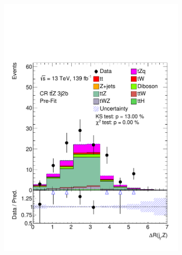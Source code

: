 \begin{figure}
\begin{subfigure}[b]{0.32\linewidth}
    \includegraphics[width=\linewidth]{ubonn-thesis/Chapters/Chapters_06/Figure/Input_distribution/CR_3j2b_dR_jf_Z.pdf} 
  \end{subfigure}
  \begin{subfigure}[b]{0.32\linewidth}
    \centering

\end{subfigure}
\end{figure}
